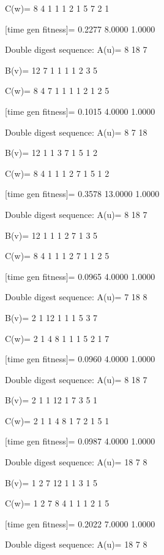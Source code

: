 C(w)=
     8     4     1     1     1     2     1     5     7     2     1

[time gen fitness]=
    0.2277    8.0000    1.0000

Double digest sequence:
A(u)=
     8    18     7

B(v)=
    12     7     1     1     1     1     2     3     5

C(w)=
     8     4     7     1     1     1     1     2     1     2     5

[time gen fitness]=
    0.1015    4.0000    1.0000

Double digest sequence:
A(u)=
     8     7    18

B(v)=
    12     1     1     3     7     1     5     1     2

C(w)=
     8     4     1     1     1     2     7     1     5     1     2

[time gen fitness]=
    0.3578   13.0000    1.0000

Double digest sequence:
A(u)=
     8    18     7

B(v)=
    12     1     1     1     2     7     1     3     5

C(w)=
     8     4     1     1     1     2     7     1     1     2     5

[time gen fitness]=
    0.0965    4.0000    1.0000

Double digest sequence:
A(u)=
     7    18     8

B(v)=
     2     1    12     1     1     1     5     3     7

C(w)=
     2     1     4     8     1     1     1     5     2     1     7

[time gen fitness]=
    0.0960    4.0000    1.0000

Double digest sequence:
A(u)=
     8    18     7

B(v)=
     2     1     1    12     1     7     3     5     1

C(w)=
     2     1     1     4     8     1     7     2     1     5     1

[time gen fitness]=
    0.0987    4.0000    1.0000

Double digest sequence:
A(u)=
    18     7     8

B(v)=
     1     2     7    12     1     1     3     1     5

C(w)=
     1     2     7     8     4     1     1     1     2     1     5

[time gen fitness]=
    0.2022    7.0000    1.0000

Double digest sequence:
A(u)=
    18     7     8

